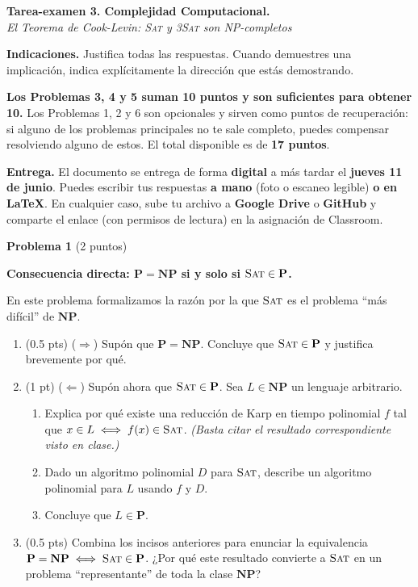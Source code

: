 \documentclass[12pt, letterpaper]{article}
\newcommand{\SAT}{\textsc{Sat}}
\newcommand{\tSAT}{\textsc{3Sat}}
\newcommand{\NP}{\mathbf{NP}}
\newcommand{\PP}{\mathbf{P}}
\newcommand{\problema}[2]{%
  \bigskip
  \noindent\textbf{Problema #1} \textnormal{(#2 puntos)}\par\smallskip
}
\begin{document}
\begin{center}
  {\large \textbf{Tarea-examen 3. Complejidad Computacional.}}\\[4pt]
  \textit{El Teorema de Cook-Levin: \SAT{} y \tSAT{} son NP-completos}
\end{center}

\smallskip
\begin{mdframed}
\textbf{Indicaciones.} Justifica todas las respuestas. Cuando demuestres una
implicación, indica explícitamente la dirección que estás demostrando.

\textbf{Los Problemas 3, 4 y 5 suman 10 puntos y son suficientes para obtener
10.}  Los Problemas 1, 2 y 6 son opcionales y sirven como puntos de
recuperación: si alguno de los problemas principales no te sale completo,
puedes compensar resolviendo alguno de estos.  El total disponible es de
\textbf{17 puntos}.

\medskip
\textbf{Entrega.}  El documento se entrega de forma \textbf{digital} a más
tardar el \textbf{jueves 11 de junio}.  Puedes escribir tus respuestas
\textbf{a mano} (foto o escaneo legible) \textbf{o en \LaTeX{}}.  En cualquier
caso, sube tu archivo a \textbf{Google Drive} o \textbf{GitHub} y comparte el
enlace (con permisos de lectura) en la asignación de Classroom.
\end{mdframed}

\problema{1}{2} \textbf{Consecuencia directa: $\PP = \NP$ si y solo si
$\SAT \in \PP$.}

En este problema formalizamos la razón por la que $\SAT$ es el problema
``más difícil'' de $\NP$.

\begin{enumerate}[label=\alph*)]

\item (0.5 pts) ($\Rightarrow$) Supón que $\PP = \NP$.  Concluye que
  $\SAT \in \PP$ y justifica brevemente por qué.

\item (1 pt) ($\Leftarrow$) Supón ahora que $\SAT \in \PP$.  Sea
  $L \in \NP$ un lenguaje arbitrario.
  \begin{enumerate}[label=\roman*.]
    \item Explica por qué existe una reducción de Karp en tiempo polinomial
      $f$ tal que $x \in L \iff f(x) \in \SAT$.  \textit{(Basta citar el
      resultado correspondiente visto en clase.)}
    \item Dado un algoritmo polinomial $D$ para $\SAT$, describe un
      algoritmo polinomial para $L$ usando $f$ y $D$.
    \item Concluye que $L \in \PP$.
  \end{enumerate}

\item (0.5 pts) Combina los incisos anteriores para enunciar la equivalencia
  $\PP = \NP \iff \SAT \in \PP$.  ¿Por qué este resultado convierte a $\SAT$
  en un problema ``representante'' de toda la clase $\NP$?

\end{enumerate}
\end{document}
